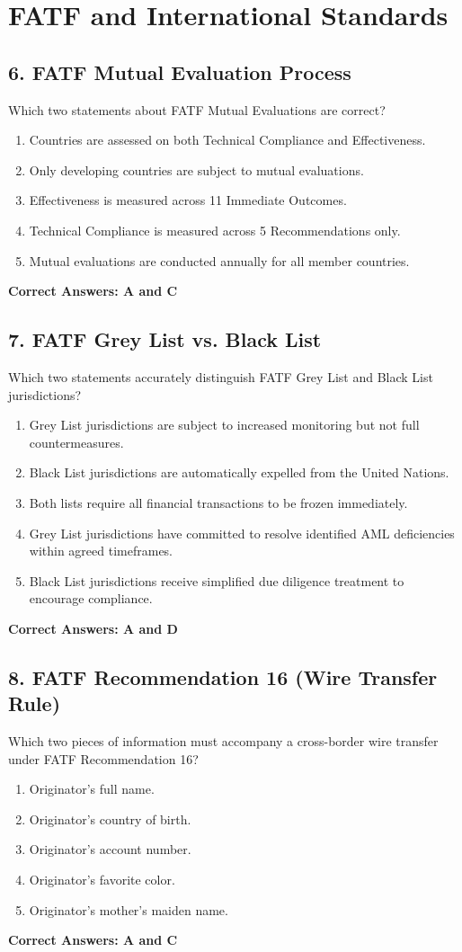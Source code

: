 \documentclass[11pt,a4paper]{article}
\begin{document}
	\section{FATF and International Standards}
	
	\subsection{6. FATF Mutual Evaluation Process}
	Which two statements about FATF Mutual Evaluations are correct?
	\begin{enumerate}[label=\Alph*.]
		\item Countries are assessed on both Technical Compliance and Effectiveness.
		\item Only developing countries are subject to mutual evaluations.
		\item Effectiveness is measured across 11 Immediate Outcomes.
		\item Technical Compliance is measured across 5 Recommendations only.
		\item Mutual evaluations are conducted annually for all member countries.
	\end{enumerate}
	\textbf{Correct Answers: A and C}
	
	\subsection{7. FATF Grey List vs. Black List}
	Which two statements accurately distinguish FATF Grey List and Black List jurisdictions?
	\begin{enumerate}[label=\Alph*.]
		\item Grey List jurisdictions are subject to increased monitoring but not full countermeasures.
		\item Black List jurisdictions are automatically expelled from the United Nations.
		\item Both lists require all financial transactions to be frozen immediately.
		\item Grey List jurisdictions have committed to resolve identified AML deficiencies within agreed timeframes.
		\item Black List jurisdictions receive simplified due diligence treatment to encourage compliance.
	\end{enumerate}
	\textbf{Correct Answers: A and D}
	
	\subsection{8. FATF Recommendation 16 (Wire Transfer Rule)}
	Which two pieces of information must accompany a cross-border wire transfer under FATF Recommendation 16?
	\begin{enumerate}[label=\Alph*.]
		\item Originator's full name.
		\item Originator's country of birth.
		\item Originator's account number.
		\item Originator's favorite color.
		\item Originator's mother's maiden name.
	\end{enumerate}
	\textbf{Correct Answers: A and C}
	
\end{document}

